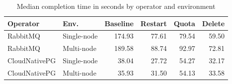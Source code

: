 \documentclass[sigconf,screen]{acmart}
\begin{document}
\begin{table}[ht]
\centering
\small
\caption{Median completion time in seconds by operator and environment}
\label{tab:median-results}
\begin{tabular}{llrrrr}
\toprule
\textbf{Operator} & \textbf{Env.} & \textbf{Baseline} & \textbf{Restart} & \textbf{Quota} & \textbf{Delete} \\
\midrule
RabbitMQ & Single-node & 174.93 & 77.61 & 79.54 & 59.50 \\
RabbitMQ & Multi-node & 189.58 & 88.74 & 92.97 & 72.81 \\
CloudNativePG & Single-node & 38.04 & 27.72 & 54.27 & 32.17 \\
CloudNativePG & Multi-node & 35.93 & 31.50 & 54.13 & 33.58 \\
\bottomrule
\end{tabular}
\end{table}
\end{document}
